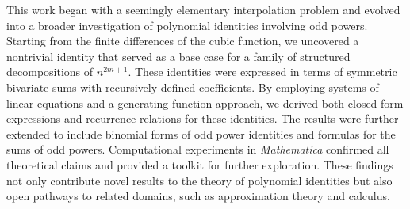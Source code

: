 This work began with a seemingly elementary interpolation problem and evolved into a broader
investigation of polynomial identities involving odd powers.
Starting from the finite differences of the cubic function, we uncovered a nontrivial identity
that served as a base case for a family of structured decompositions of $n^{2m+1}$.
These identities were expressed in terms of symmetric bivariate sums with recursively defined coefficients.
By employing systems of linear equations and a generating function approach,
we derived both closed-form expressions and recurrence relations for these identities.
The results were further extended to include binomial forms of odd power identities
and formulas for the sums of odd powers.
Computational experiments in \textit{Mathematica} confirmed all theoretical claims and provided
a toolkit for further exploration.
These findings not only contribute novel results to the theory of polynomial identities but also
open pathways to related domains, such as approximation theory and calculus.
